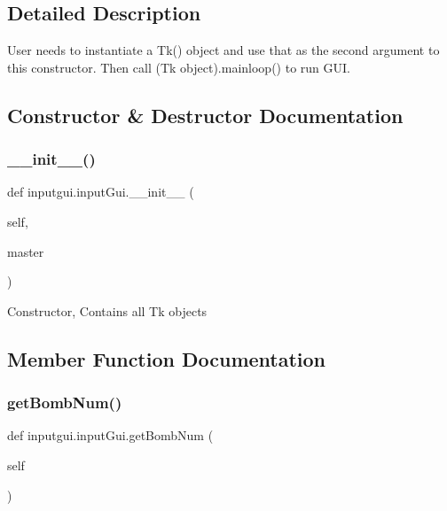 \subsection{Detailed Description}
\begin{DoxyVerb}User needs to instantiate a Tk() object and use that as the second argument to this constructor. Then call
    (Tk object).mainloop() to run GUI.
\end{DoxyVerb}
 

\subsection{Constructor \& Destructor Documentation}
\mbox{\label{classinputgui_1_1input_gui_af9af6444741570b26c7f419d11c6e823}} 
\subsubsection{\texorpdfstring{\+\_\+\+\_\+init\+\_\+\+\_\+()}{\_\_init\_\_()}}
{\footnotesize\ttfamily def inputgui.\+input\+Gui.\+\_\+\+\_\+init\+\_\+\+\_\+ (\begin{DoxyParamCaption}\item[{}]{self,  }\item[{}]{master }\end{DoxyParamCaption})}

\begin{DoxyVerb}Constructor, Contains all Tk objects
\end{DoxyVerb}
 

\subsection{Member Function Documentation}
\mbox{\label{classinputgui_1_1input_gui_ad092a378c7af02c7bef4055297ad10d0}} 
\subsubsection{\texorpdfstring{get\+Bomb\+Num()}{getBombNum()}}
{\footnotesize\ttfamily def inputgui.\+input\+Gui.\+get\+Bomb\+Num (\begin{DoxyParamCaption}\item[{}]{self }\end{DoxyParamCaption})}

